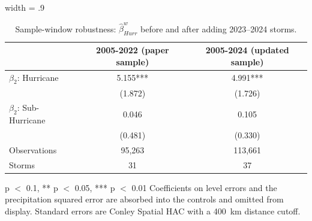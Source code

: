 \begin{table}

\caption{Sample-window robustness: $\hat{\beta}^w_{Hurr}$ before and after adding 2023--2024 storms. \label{tab:appA_sample}}
\centering
\begin{adjustbox}{width = .9\textwidth}
\begin{threeparttable}
\begin{tabular}[t]{lcc}
\toprule
  & 2005-2022 (paper sample) & 2005-2024 (updated sample)\\
\midrule
$\beta_2$: Hurricane & \num{5.155}*** & \num{4.991}***\\
 & (\num{1.872}) & (\num{1.726})\\
$\beta_2$: Sub-Hurricane & \num{0.046} & \num{0.105}\\
 & (\num{0.481}) & (\num{0.330})\\
Observations & 95,263 & 113,661\\
Storms & 31 & 37\\
\bottomrule
\end{tabular}
\begin{tablenotes}
\item * p $<$ 0.1, ** p $<$ 0.05, *** p $<$ 0.01 Coefficients on level errors and the precipitation squared error are absorbed into the controls and omitted from display. Standard errors are Conley Spatial HAC with a 400~km distance cutoff.
\end{tablenotes}
\end{threeparttable}
\end{adjustbox}
\end{table}
